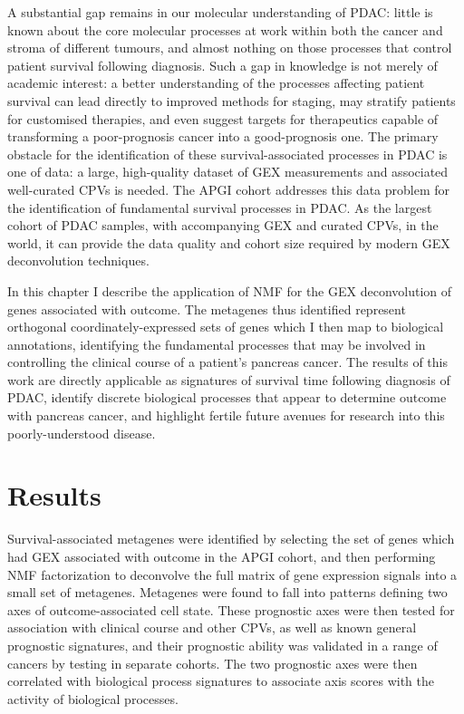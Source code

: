 \documentclass[dissertation.tex]{subfiles}
\begin{document}
A substantial gap remains in our molecular understanding of \gls{PDAC}: little is known about the core molecular processes at work within both the cancer and stroma of different tumours, and almost nothing on those processes that control patient survival following diagnosis.  Such a gap in knowledge is not merely of academic interest: a better understanding of the processes affecting patient survival can lead directly to improved methods for staging, may stratify patients for customised therapies, and even suggest targets for therapeutics capable of transforming a poor-prognosis cancer into a good-prognosis one.  The primary obstacle for the identification of these survival-associated processes in \gls{PDAC} is one of data: a large, high-quality dataset of \gls{GEX} measurements and associated well-curated \glspl{CPV} is needed.  The \gls{APGI} cohort addresses this data problem for the identification of fundamental survival processes in \gls{PDAC}.  As the largest cohort of \gls{PDAC} samples, with accompanying \gls{GEX} and curated \glspl{CPV}, in the world, it can provide the data quality and cohort size required by modern \gls{GEX} deconvolution techniques.

In this chapter I describe the application of \gls{NMF} for the \gls{GEX} deconvolution of genes associated with outcome.  The metagenes thus identified represent orthogonal coordinately-expressed sets of genes which I then map to biological annotations, identifying the fundamental processes that may be involved in controlling the clinical course of a patient's pancreas cancer.  The results of this work are directly applicable as signatures of survival time following diagnosis of \gls{PDAC}, identify discrete biological processes that appear to determine outcome with pancreas cancer, and highlight fertile future avenues for research into this poorly-understood disease.


\section{Results}

Survival-associated metagenes were identified by selecting the set of genes which had \gls{GEX} associated with outcome in the \gls{APGI} cohort, and then performing \gls{NMF} factorization to deconvolve the full matrix of gene expression signals into a small set of metagenes.  Metagenes were found to fall into patterns defining two axes of outcome-associated cell state.  These prognostic axes were then tested for association with clinical course and other \glspl{CPV}, as well as known general prognostic signatures, and their prognostic ability was validated in a range of cancers by testing in separate cohorts.  The two prognostic axes were then correlated with biological process signatures to associate axis scores with the activity of biological processes.
\end{document}
